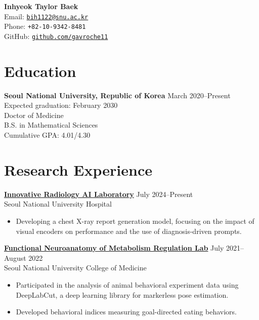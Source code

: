 \documentclass[10pt, a4paper]{article}
\newenvironment{customitemize}
	{\begin{itemize}[leftmargin=*, noitemsep, topsep=0pt, label=$\cdot$]}
	{\end{itemize}}
\begin{document}
\begin{center}
    \textbf{\Large Inhyeok Taylor Baek}\\
    \vspace{0.5mm}
    Email: \href{mailto:bih1122@snu.ac.kr}{\texttt{bih1122@snu.ac.kr}} \\
    Phone: \texttt{+82-10-9342-8481} \\
    GitHub: \href{https://github.com/gavroche11}{\texttt{github.com/gavroche11}} \\
    
\end{center}

\section*{Education}
\textbf{Seoul National University, Republic of Korea} \hfill March 2020--Present \\
\null \hfill {Expected graduation: February 2030}\smallskip \\
Doctor of Medicine\\
B.S. in Mathematical Sciences\\
Cumulative GPA: 4.01/4.30

\section*{Research Experience}
\href{http://irail.snu.ac.kr}{\textbf{Innovative Radiology AI Laboratory}} \hfill July 2024--Present\\
Seoul National University Hospital \smallskip
\begin{customitemize}
    \item Developing a chest X-ray report generation model, focusing on the impact of visual encoders on performance and the use of diagnosis-driven prompts.
\end{customitemize}
\bigskip
\href{https://fnmr.snu.ac.kr/}{\textbf{Functional Neuroanatomy of Metabolism Regulation Lab}} \hfill July 2021--August 2022\\
Seoul National University College of Medicine \smallskip
\begin{customitemize}
    \item \sloppy Participated in the analysis of animal behavioral experiment data using DeepLabCut, a deep learning library for markerless pose estimation.
    \item Developed behavioral indices measuring goal-directed eating behaviors.
\end{customitemize}
\end{document}
